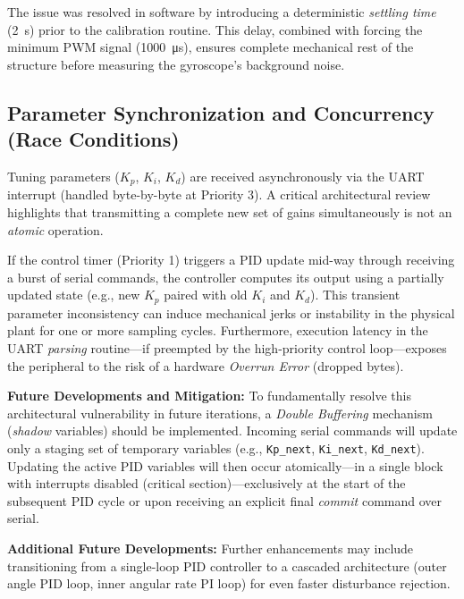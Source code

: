 \documentclass[11pt, a4paper]{article}
\begin{document}
The issue was resolved in software by introducing a deterministic \textit{settling time} (\SI{2}{\second}) prior to the calibration routine. This delay, combined with forcing the minimum PWM signal (\SI{1000}{\micro\second}), ensures complete mechanical rest of the structure before measuring the gyroscope's background noise.

\subsection{Parameter Synchronization and Concurrency (Race Conditions)}
Tuning parameters ($K_p$, $K_i$, $K_d$) are received asynchronously via the UART interrupt (handled byte-by-byte at Priority 3). A critical architectural review highlights that transmitting a complete new set of gains simultaneously is not an \textit{atomic} operation.

If the control timer (Priority 1) triggers a PID update mid-way through receiving a burst of serial commands, the controller computes its output using a partially updated state (e.g., new $K_p$ paired with old $K_i$ and $K_d$). This transient parameter inconsistency can induce mechanical jerks or instability in the physical plant for one or more sampling cycles. Furthermore, execution latency in the UART \textit{parsing} routine—if preempted by the high-priority control loop—exposes the peripheral to the risk of a hardware \textit{Overrun Error} (dropped bytes).

\textbf{Future Developments and Mitigation:}
To fundamentally resolve this architectural vulnerability in future iterations, a \textit{Double Buffering} mechanism (\textit{shadow} variables) should be implemented. Incoming serial commands will update only a staging set of temporary variables (e.g., \texttt{Kp\_next}, \texttt{Ki\_next}, \texttt{Kd\_next}). Updating the active PID variables will then occur atomically—in a single block with interrupts disabled (critical section)—exclusively at the start of the subsequent PID cycle or upon receiving an explicit final \textit{commit} command over serial.

\textbf{Additional Future Developments:}
Further enhancements may include transitioning from a single-loop PID controller to a cascaded architecture (outer angle PID loop, inner angular rate PI loop) for even faster disturbance rejection.
\end{document}
